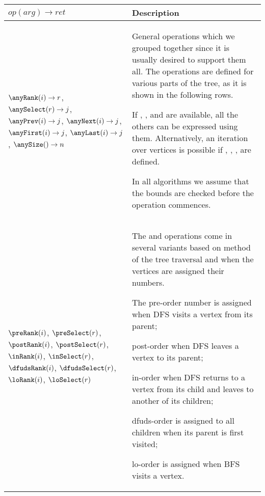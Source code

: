 \begin{sidewaystable}
	\centering
	\begin{tabularx}{\textwidth}{|L{0.5}|J{1.5}|}
		\hline
		$\mathit{op}(\mathit{arg}) \rightarrow \mathit{ret}$
		& Description \\ \hline \hline
		
		$\anyRank(i) \rightarrow r$,
		$\anySelect(r) \rightarrow j$, \newline
		$\anyPrev(i) \rightarrow j$,
		$\anyNext(i) \rightarrow j$, \newline
		$\anyFirst(i) \rightarrow j$,
		$\anyLast(i) \rightarrow j$, \newline
		$\anySize() \rightarrow n$
		& General operations which we grouped together since it is usually desired to support them all.
		The operations are defined for various parts of the tree, as it is shown in the following rows.
		
		If \anyRank{}, \anySelect{}, and \anySize{} are available, all the others can be expressed using them.
		Alternatively, an iteration over vertices is possible if \anyPrev{}, \anyNext{}, \anyFirst{}, \anyLast{} are defined.
		
		In all algorithms we assume that the bounds are checked before the operation commences.\\ \hline \hline
		
		$\preRank(i)$, $\preSelect(r)$, \newline
		$\postRank(i)$, $\postSelect(r)$, \newline
		$\inRank(i)$, $\inSelect(r)$, \newline
		$\dfudsRank(i)$, $\dfudsSelect(r)$, \newline
		$\loRank(i)$, $\loSelect(r)$
		& The \rank{} and \select{} operations come in several variants based on method of the tree traversal and when the vertices are assigned their numbers.
		\begin{itemize*}
			\item The pre-order number is assigned when DFS visits a vertex from its parent;
			\item post-order when DFS leaves a vertex to its parent;
			\item in-order when DFS returns to a vertex from its child and leaves to another of its children;
			\item dfuds-order is assigned to all children when its parent is first visited;
			\item lo-order is assigned when BFS visits a vertex.
		\end{itemize*}\\ \hline
		

\end{tabularx}
\end{sidewaystable}
